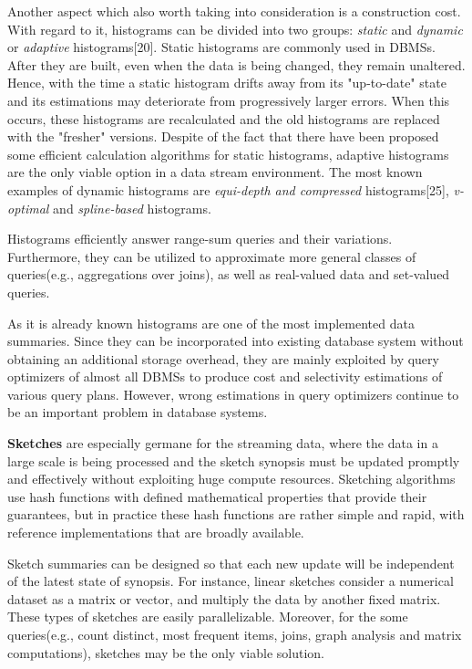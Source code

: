 \documentclass[10pt, conference, compsocconf]{IEEEtran}
\begin{document}
Another aspect which also worth taking into consideration is a construction cost. With regard to it, histograms can be divided into two groups: \textit{static} and \textit{dynamic} or \textit{adaptive} histograms[20]. Static histograms are commonly used in DBMSs. After they are built, even when the data is being changed, they remain unaltered. Hence, with the time a static histogram drifts away from its "up-to-date" state and its estimations may deteriorate from progressively larger errors. When this occurs, these histograms are recalculated and the old histograms are replaced with the "fresher" versions. 
Despite of the fact that there have been proposed some efficient calculation algorithms for static histograms, adaptive histograms are the only viable option in a data stream environment. The most known examples of dynamic histograms are \textit{equi-depth and compressed} histograms[25], \textit{v-optimal} and \textit{spline-based} histograms. 

Histograms efficiently answer range-sum queries and their variations. Furthermore, they can be utilized to approximate more general classes of queries(e.g., aggregations over joins), as well as real-valued data and set-valued queries.
  
As it is already known histograms are one of the most implemented data summaries. Since they can be incorporated into existing database system without obtaining an additional storage overhead, they are mainly exploited by query optimizers of almost all DBMSs to produce cost and selectivity estimations of various query plans. However, wrong estimations in query optimizers continue to be an important problem in database systems.

\textbf{Sketches} are especially germane for the streaming data, where the data in a large scale is being processed and the sketch synopsis must be updated promptly and effectively without exploiting huge compute resources. Sketching algorithms use hash functions with defined mathematical properties that provide their guarantees, but in practice these hash functions are rather simple and rapid, with reference implementations that are broadly available.  

Sketch summaries can be designed so that each new update will be independent of the latest state of synopsis. For instance, linear sketches consider a numerical dataset as a matrix or vector, and multiply the data by another fixed matrix. These types of sketches are easily parallelizable. Moreover, for the some queries(e.g., count distinct, most frequent items, joins, graph analysis and matrix computations), sketches may be the only viable solution.
\end{document}
